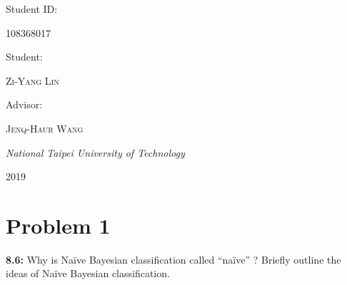 \begin{titlepage}
	
	Student ID:

	\vspace{0.5\baselineskip}

	{\scshape 108368017}

	\vspace{0.5\baselineskip}

	Student: 
	
	\vspace{0.5\baselineskip} %

	{\scshape\Large Zi-Yang Lin } %

	\vspace{0.5\baselineskip} %


	Advisor:

	\vspace{0.5\baselineskip} %
	
	{\scshape\Large Jenq-Haur Wang} %
	
	\vspace{0.5\baselineskip} %
	
	\textit{National Taipei University of Technology} %
	
	\vfill %
	
	
	
	\vspace{0.3\baselineskip} %
	
	2019 %
	

\end{titlepage}


\clearpage

\section*{Problem 1}
\textbf{8.6:} Why is Naïve Bayesian classification called ``naïve'' ? 
Briefly outline the ideas of Naïve Bayesian classification.
